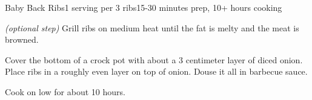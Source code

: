 \documentclass[../Cookbook.tex]{subfiles}
\begin{document}
\begin{recipe}{Baby Back Ribs}{1 serving per 3 ribs}{15-30 minutes prep, 10+ hours cooking}

\textit{(optional step)} Grill ribs on medium heat until the fat is melty and the meat is browned.

Cover the bottom of a crock pot with about a 3 centimeter layer of diced onion. Place ribs in a roughly even layer on top of onion. Douse it all in barbecue sauce.

\newstep
Cook on low for about 10 hours.

\end{recipe}
\end{document}
